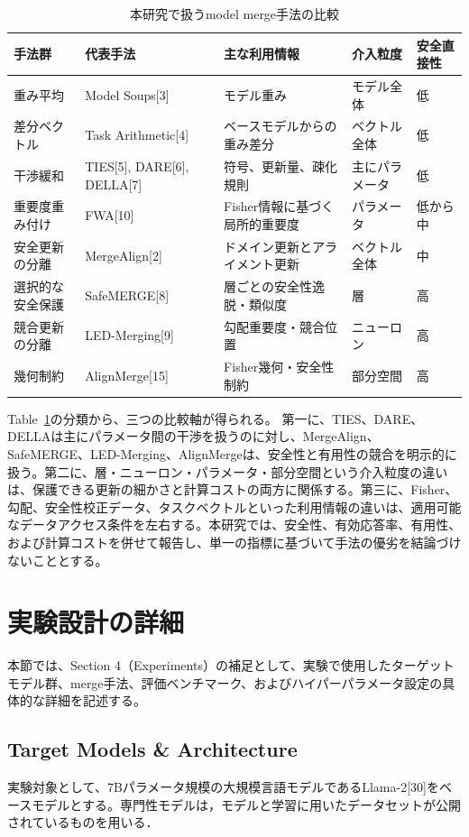\documentclass{article}
\begin{document}
\begin{table}[t]
\centering
\caption{本研究で扱うmodel merge手法の比較}
\label{tab:method-comparison-revised}
\small
\begin{tabular}{p{2.3cm}p{2.7cm}p{2.8cm}p{2.0cm}p{1.8cm}}
\toprule
手法群 & 代表手法 & 主な利用情報 & 介入粒度 & 安全直接性 \\
\midrule
重み平均 &  Model Soups[3] & モデル重み & モデル全体 & 低 \\
差分ベクトル & Task Arithmetic[4] & ベースモデルからの重み差分 & ベクトル全体 & 低 \\
干渉緩和 & TIES[5], DARE[6], DELLA[7] & 符号、更新量、疎化規則 & 主にパラメータ & 低 \\
重要度重み付け & FWA[10] & Fisher情報に基づく局所的重要度 & パラメータ & 低から中 \\
安全更新の分離 & MergeAlign[2] & ドメイン更新とアライメント更新 & ベクトル全体 & 中 \\
選択的な安全保護 & SafeMERGE[8] & 層ごとの安全性逸脱・類似度 & 層 & 高 \\
競合更新の分離 & LED-Merging[9] & 勾配重要度・競合位置 & ニューロン & 高 \\
幾何制約 & AlignMerge[15] & Fisher幾何・安全性制約 & 部分空間 & 高 \\
\bottomrule
\end{tabular}
\end{table}

Table~\ref{tab:method-comparison-revised}の分類から、三つの比較軸が得られる。
第一に、TIES、DARE、DELLAは主にパラメータ間の干渉を扱うのに対し、MergeAlign、SafeMERGE、LED-Merging、AlignMergeは、安全性と有用性の競合を明示的に扱う。第二に、層・ニューロン・パラメータ・部分空間という介入粒度の違いは、保護できる更新の細かさと計算コストの両方に関係する。第三に、Fisher、勾配、安全性校正データ、タスクベクトルといった利用情報の違いは、適用可能なデータアクセス条件を左右する。本研究では、安全性、有効応答率、有用性、および計算コストを併せて報告し、単一の指標に基づいて手法の優劣を結論づけないこととする。

\section{実験設計の詳細}
\label{app:実験設計の詳細}
本節では、Section 4（Experiments）の補足として、実験で使用したターゲットモデル群、merge手法、評価ベンチマーク、およびハイパーパラメータ設定の具体的な詳細を記述する。

\subsection{Target Models \& Architecture}
実験対象として、7Bパラメータ規模の大規模言語モデルであるLlama-2[30]をベースモデルとする。専門性モデルは，モデルと学習に用いたデータセットが公開されているものを用いる．
\end{document}
